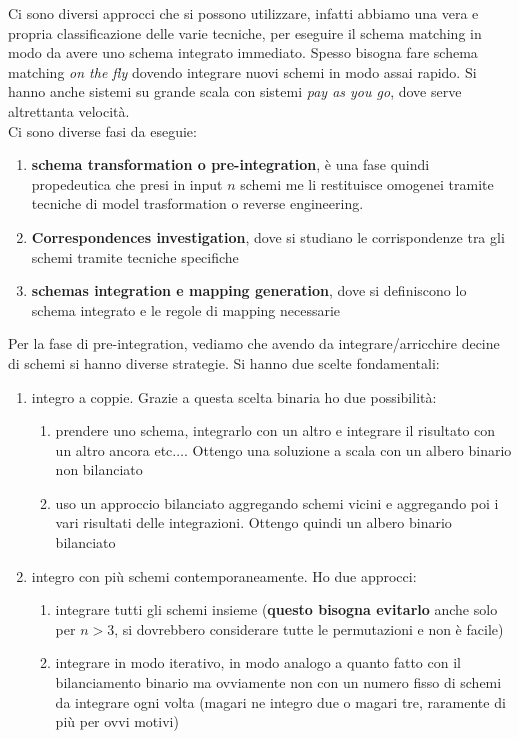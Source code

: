 Ci sono diversi approcci che si possono utilizzare, infatti abbiamo una vera e propria classificazione delle varie tecniche, per eseguire il schema matching in modo da avere uno schema integrato immediato. Spesso bisogna fare schema matching \textit{on the fly} dovendo integrare nuovi schemi in modo assai rapido. Si hanno anche sistemi su grande scala con sistemi \textit{pay as you go}, dove serve altrettanta velocità.\\

Ci sono diverse fasi da eseguie:
\begin{enumerate}
    \item \textbf{schema transformation o pre-integration}, è una fase quindi propedeutica che presi in input $n$ schemi me li restituisce omogenei tramite tecniche di model trasformation o reverse engineering. 
    \item \textbf{Correspondences investigation}, dove si studiano le corrispondenze tra gli schemi tramite tecniche specifiche
    \item \textbf{schemas integration e mapping generation}, dove si definiscono lo schema integrato e le regole di mapping necessarie
\end{enumerate}
Per la fase di pre-integration, vediamo che  avendo da integrare/arricchire decine di schemi si hanno diverse strategie. Si hanno due scelte fondamentali:
\begin{enumerate}
    \item integro a coppie. Grazie a questa scelta binaria ho due possibilità:
        \begin{enumerate}
            \item prendere uno schema, integrarlo con un altro e integrare il risultato con un altro ancora etc$\ldots$. Ottengo una soluzione a scala con un albero binario non bilanciato
            \item uso un approccio bilanciato aggregando schemi vicini e aggregando poi i vari risultati delle integrazioni. Ottengo quindi un albero binario bilanciato 
        \end{enumerate}
    \item integro con più schemi contemporaneamente. Ho due approcci:
        \begin{enumerate}
            \item integrare tutti gli schemi insieme (\textbf{questo bisogna evitarlo} anche solo per $n>3$, si dovrebbero considerare tutte le permutazioni e non è facile)
            \item integrare in modo iterativo, in modo analogo a quanto fatto con il bilanciamento binario ma ovviamente non con un numero fisso di schemi da integrare ogni volta (magari ne integro due o magari tre, raramente di più per ovvi motivi)
        \end{enumerate}
\end{enumerate}

